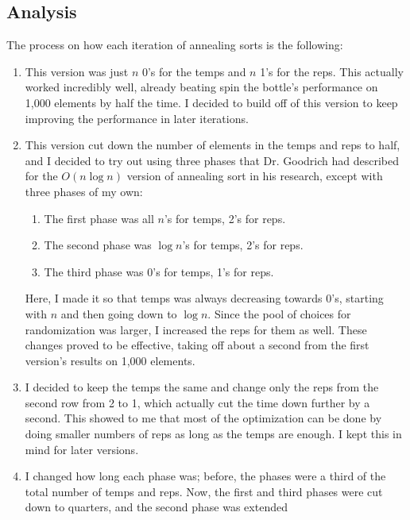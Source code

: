 \documentclass{article}
\begin{document}
\subsection{Analysis}
    The process on how each iteration of annealing sorts is the following:
    \begin{enumerate}
        \item This version was just $n$ 0's for the temps and $n$ 1's for the
            reps. This actually worked incredibly well, already beating spin
            the bottle's performance on 1,000 elements by half the time. I 
            decided to build off of this version to keep improving the
            performance in later iterations.
        \item This version cut down the number of elements in the temps and
            reps to half, and I decided to try out using three phases that Dr.
            Goodrich had described for the $O(n\log{n})$ version of annealing
            sort in his research, except with three phases of my own:
            \begin{enumerate}
                \item The first phase was all $n$'s for temps, 2's for reps.
                \item The second phase was $\log{n}$'s for temps, 2's for reps.
                \item The third phase was 0's for temps, 1's for reps.
            \end{enumerate}
            Here, I made it so that temps was always decreasing towards 0's,
            starting with $n$ and then going down to $\log{n}$. Since the pool
            of choices for randomization was larger, I increased the reps for
            them as well. These changes proved to be effective, taking off about
            a second from the first version's results on 1,000 elements.
        \item I decided to keep the temps the same and change only the reps
            from the second row from 2 to 1, which actually cut the time down
            further by a second. This showed to me that most of the optimization
            can be done by doing smaller numbers of reps as long as the temps
            are enough. I kept this in mind for later versions.
        \item I changed how long each phase was; before, the phases were a third
            of the total number of temps and reps. Now, the first and third
            phases were cut down to quarters, and the second phase was extended

\end{enumerate}
\end{document}
